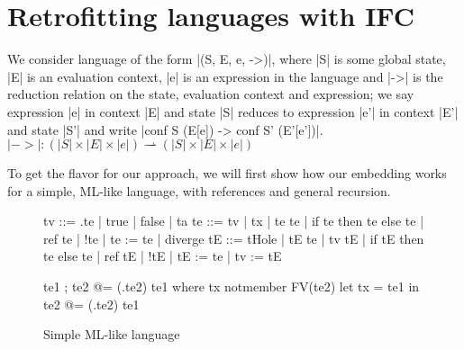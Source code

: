 \section{Retrofitting languages with IFC}
\label{sec:retrofit}

We consider language of the form |(S, E, e, ->)|, where |S| is some
global state, |E| is an evaluation context, |e| is an expression in
the language and |->| is the reduction relation on the state,
evaluation context and expression;
we say expression |e| in context |E| and state |S| reduces to
expression |e'| in context |E'| and state |S'| and write
|conf S (E[e]) -> conf S' (E'[e'])|.
$|->| : (|S| \times |E| \times |e|) \rightharpoonup (|S| \times |E| \times |e|)$


To get the flavor for our approach, we will first show how our embedding
works for a simple, ML-like language, with references and general recursion.

\begin{figure}
\begin{code}
tv   ::= \tx.te | true | false | ta
te   ::= tv | tx | te te | if te then te else te | ref te | !te | te := te | diverge
tE   ::= tHole | tE te | tv tE | if tE then te else te
       | ref tE | !tE | tE := te | tv := tE 

te1 ; te2            @= (\tx.te2) te1  where  tx notmember FV(te2)
let tx = te1 in te2  @= (\tx.te2) te1
\end{code}


\caption{Simple ML-like language}
\label{fig:ml}
\end{figure}

